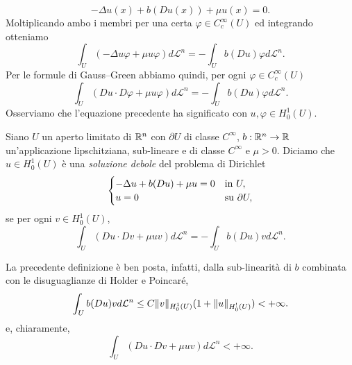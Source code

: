 \[ -\Delta u(x) + b(Du(x)) + \mu u(x) = 0. \]
Moltiplicando ambo i membri per una certa $\varphi \in C^\infty_c(U)$ ed integrando otteniamo 
\[ \int_U \left( -\Delta u \varphi + \mu u\varphi\right) d\mathcal{L}^n = -\int_U b(Du) \varphi d\mathcal{L}^n. \]
Per le formule di Gauss--Green abbiamo quindi, per ogni $\varphi \in C^\infty_c(U)$
\[ \int_U \left( Du \cdot D\varphi +\mu u \varphi\right)  d\mathcal{L}^n = -\int_U b(Du) \varphi d\mathcal{L}^n. \]
Osserviamo che l'equazione precedente ha significato con $u,\varphi \in H^1_0(U)$.
\begin{definizione}
	Siano $U$ un aperto limitato di $\mathbb{R}^n$ con $\partial U$ di classe $C^\infty$, $b: \mathbb{R}^n \to \mathbb{R}$ un'applicazione lipschitziana, sub-lineare e di classe $C^\infty$ e $\mu >0$.	Diciamo che $u \in H^1_0(U)$ è una \emph{soluzione debole} del problema di Dirichlet
	\[ 	\begin{cases}
		-\Delta u + b(Du) + \mu u = 0 & \textup{in } U,\\
		u = 0 & \textup{su } \partial U,
	\end{cases} \]
	se per ogni $v \in H^1_0(U)$, 
	\[ \int_U \left( Du \cdot Dv +\mu u v\right)  d\mathcal{L}^n = -\int_U b(Du) v d\mathcal{L}^n. \]
\end{definizione}
\begin{osservazione}
	La precedente definizione è ben posta, infatti, dalla sub-linearità di $b$ combinata con le disuguaglianze di Holder e Poincaré,
	\[ \int_U b(Du) v d\mathcal{L}^n \le C\lVert v\rVert_{H^1_0(U)}(1+\lVert u\rVert_{H^!_0(U)})<+\infty.  \]
	e, chiaramente,
	\[  \int_U \left( Du \cdot Dv +\mu u v\right)  d\mathcal{L}^n < +\infty.\]
\end{osservazione}

